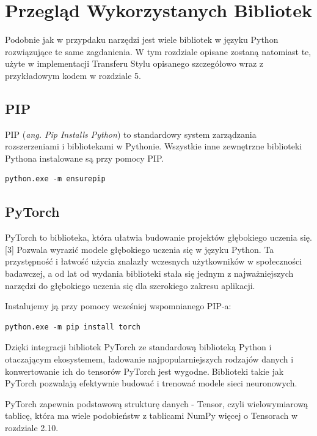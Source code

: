 \documentclass[brudnopis]{xmgr}
\begin{document}
\chapter{Przegląd Wykorzystanych Bibliotek}


Podobnie jak w przypdaku narzędzi jest wiele bibliotek w języku Python rozwiązujące te same zagdanienia. 
W tym rozdziale opisane zostaną natomiast te, użyte w implementacji Transferu Stylu opisanego szczegółowo wraz z przykładowym kodem w rozdziale 5.

 \section{PIP\label{s:dsssl}}
 PIP (\textit{ang. Pip Installs Python}) to standardowy system zarządzania rozszerzeniami i bibliotekami w Pythonie. Wszystkie inne zewnętrzne biblioteki Pythona instalowane są przy pomocy PIP.

\begin{lstlisting}
python.exe -m ensurepip
\end{lstlisting}


 

    \section{PyTorch\label{s:dsssl}}
    
    
PyTorch to biblioteka, która ułatwia budowanie projektów głębokiego uczenia się. [3] Pozwala wyrazić modele głębokiego uczenia się w języku Python. Ta przystępność i łatwość użycia znalazły wczesnych użytkowników w społeczności badawczej, a od lat od wydania biblioteki stała się jednym z najważniejszych narzędzi do głębokiego uczenia się dla szerokiego zakresu aplikacji.

Instalujemy ją przy pomocy wcześniej wspomnianego PIP-a:

\begin{lstlisting}
python.exe -m pip install torch
\end{lstlisting}


Dzięki integracji bibliotek PyTorch ze standardową biblioteką Python i otaczającym ekosystemem, ładowanie najpopularniejszych rodzajów danych i konwertowanie ich do tensorów PyTorch jest wygodne.􏰹Biblioteki takie jak PyTorch pozwalają efektywnie budować i trenować modele sieci neuronowych.

PyTorch zapewnia podstawową strukturę danych - Tensor, czyli wielowymiarową tablicę, która ma wiele podobieństw z tablicami NumPy więcej o Tensorach w rozdziale 2.10.
\end{document}
